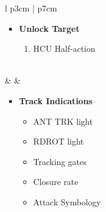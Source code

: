 \documentclass[8pt,usenames,dvipsnames,twoside]{article}
\begin{document}
\begin{center}
\begin{longtable}{l p{3cm} | p{7cm}}
\begin{minipage}[t]{\linewidth}
\begin{itemize}
						\item \textbf{Unlock Target}
						\begin{enumerate}[label=(\alph*), resume]
							\item HCU Half-action
						\end{enumerate}
					\end{itemize}
				\end{minipage} \\
				\midrule
				\textbullet &  & 
				\begin{minipage}[t]{\linewidth}
					\vspace{-7pt}
					\begin{itemize}
						\item \textbf{Track Indications}
						\begin{itemize}
							\item ANT TRK light
							\item RDROT light
							\item Tracking gates
							\item Closure rate 
							\item Attack Symbology
						\end{itemize}
					\end{itemize}
				\end{minipage} \\
				\bottomrule
			\end{longtable}
		\end{center}
	
		\clearpage
		
\end{document}

